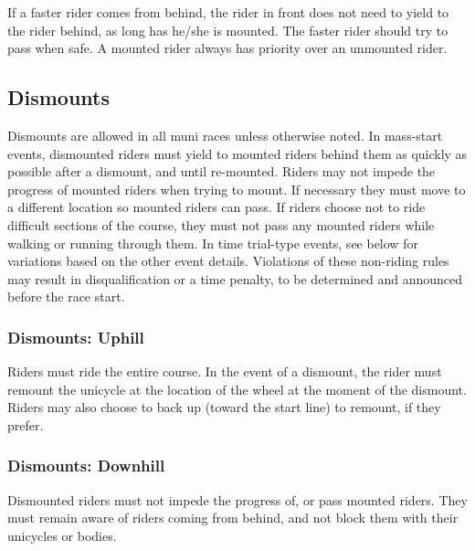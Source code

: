 If a faster rider comes from behind, the rider in front does not need to yield to the rider behind, as long has he/she is mounted.
The faster rider should try to pass when safe.
A mounted rider always has priority over an unmounted rider.

\subsection{Dismounts}
Dismounts are allowed in all muni races unless otherwise noted.
In mass-start events, dismounted riders must yield to mounted riders behind them as quickly as possible after a dismount, and until re-mounted.
Riders may not impede the progress of mounted riders when trying to mount.
If necessary they must move to a different location so mounted riders can pass.
If riders choose not to ride difficult sections of the course, they must not pass any mounted riders while walking or running through them.
In time trial-type events, see below for variations based on the other event details.
Violations of these non-riding rules may result in disqualification or a time penalty, to be determined and announced before the race start.

\subsubsection{Dismounts: Uphill}
Riders must ride the entire course.
In the event of a dismount, the rider must remount the unicycle at the location of the wheel at the moment of the dismount.
Riders may also choose to back up (toward the start line) to remount, if they prefer.

\subsubsection{Dismounts: Downhill}

Dismounted riders must not impede the progress of, or pass mounted riders.
They must remain aware of riders coming from behind, and not block them with their
unicycles or bodies.

